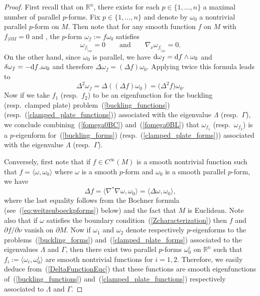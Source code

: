 \documentclass[10pt,a4paper]{amsart}
\let\<\langle
\let\>\rangle
\numberwithin{equation}{section}
\theoremstyle{definition}
\begin{document}
\begin{proof} First recall that on $\mathbb{R}^n$, there exists for each $p\in\{1,\dots,n\}$ a maximal number of parallel $p$-forms.
Fix $p\in\{1,\dots,n\}$ and denote by $\omega_0$ a nontrivial parallel $p$-form on $M$.
Then note that for any smooth function $f$ on $M$ with $f_{|\partial M}=0$ and , the $p$-form $\omega_f:=f \omega_0$ satisfies
\begin{equation}\label{fomega0BC}
\omega_{f_{|_{\partial M}}}=0\qquad\text{and}\qquad \nabla_\nu\omega_{f_{|_{\partial M}}}=0.
\end{equation}
On the other hand, since $\omega_0$ is parallel, we have ${\rm d}\omega_f={\rm d}f\wedge\omega_0$ and $\delta\omega_f=-{\rm d}f\lrcorner\omega_0$ and therefore $\Delta\omega_f=(\Delta f)\omega_0$. Applying twice this formula leads to
\begin{equation}\label{fomega0BL}
\Delta^2\omega_f=\Delta ((\Delta f)\omega_0 )=\bigl(\Delta^2 f\bigr)\omega_0.
\end{equation}
Now if we take $f_1$ (resp.\ $f_2$) to be an eigenfunction for the buckling (resp.\ clamped plate) problem~(\ref{buckling_functions}) (resp.\ (\ref{clamped_plate_functions})) associated with the eigenvalue $\Lambda$ (resp.\ $\Gamma$), we conclude combining~(\ref{fomega0BC}) and~(\ref{fomega0BL}) that $\omega_{f_1}$ (resp.\ $\omega_{f_2}$) is a $p$-eigenform for~(\ref{buckling_forms}) (resp.\ (\ref{clamped_plate_forms})) associated with the eigenvalue $\Lambda$ (resp.\ $\Gamma$).

Conversely, first note that if $f\in C^\infty(M)$ is a smooth nontrivial function such that $f=\<\omega,\omega_0\>$ where $\omega$ is a smooth $p$-form and $\omega_0$ is a smooth parallel $p$-form, we have
\begin{equation}\label{DeltaFunctionEuc}
\Delta f=\<\nabla^\ast\nabla\omega,\omega_0\>=\<\Delta\omega,\omega_0\>,
\end{equation}
where the last equality follows from the Bochner formula (see~(\ref{eq:weitzenboeckpforms}) below) and the fact that $M$ is Euclidean.
Note also that if $\omega$ satisfies the boundary condition~(\ref{Zcharacterization}) then $f$ and $\partial f/\partial\nu$ vanish on $\partial M$.
Now if $\omega_1$ and $\omega_2$ denote respectively $p$-eigenforms to the problems~(\ref{buckling_forms}) and~(\ref{clamped_plate_forms}) associated to the eigenvalues $\Lambda$ and $\Gamma$, then there exist two parallel $p$-forms $\omega^i_0$ on $\mathbb{R}^n$ such that $f_i:=\bigl\langle\omega_i,\omega^i_0\big\rangle$ are smooth nontrivial functions for $i=1,2$. Therefore, we easily deduce from~(\ref{DeltaFunctionEuc}) that these functions are smooth eigenfunctions of~(\ref{buckling_functions}) and~(\ref{clamped_plate_functions}) respectively associated to $\Lambda$ and $\Gamma$.
\end{proof}
\end{document}
